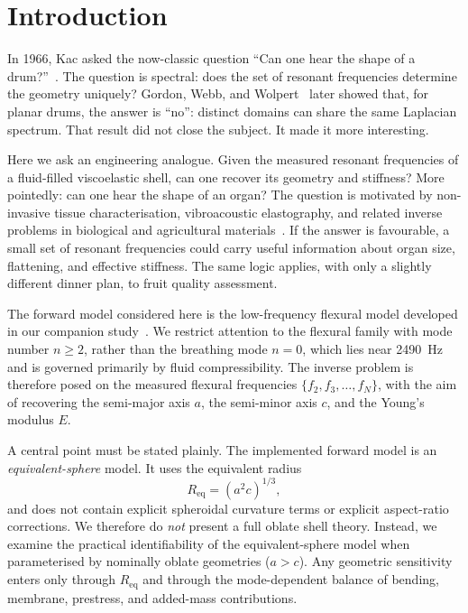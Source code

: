 \section{Introduction}\label{sec:introduction}

In 1966, Kac asked the now-classic question ``Can one hear the shape of a
drum?''~\cite{Kac1966}.  The question is spectral: does the set of resonant
frequencies determine the geometry uniquely?  Gordon, Webb, and
Wolpert~\cite{Gordon1992} later showed that, for planar drums, the answer is
``no'': distinct domains can share the same Laplacian spectrum.  That result
did not close the subject.  It made it more interesting.

Here we ask an engineering analogue.  Given the measured resonant frequencies
of a fluid-filled viscoelastic shell, can one recover its geometry and
stiffness?  More pointedly: can one hear the shape of an organ?  The question
is motivated by non-invasive tissue characterisation, vibroacoustic
elastography, and related inverse problems in biological and agricultural
materials~\cite{Sarvazyan1998,Doyley2012}.  If the answer is favourable, a
small set of resonant frequencies could carry useful information about organ
size, flattening, and effective stiffness.  The same logic applies, with only a
slightly different dinner plan, to fruit quality assessment.

The forward model considered here is the low-frequency flexural model developed
in our companion study~\cite{BrowntoneCompanion}.  We restrict attention to the
flexural family with mode number $n \geq 2$, rather than the breathing mode
$n=0$, which lies near \SI{2490}{Hz} and is governed primarily by fluid
compressibility.  The inverse problem is therefore posed on the measured
flexural frequencies
$\{f_2,f_3,\ldots,f_N\}$, with the aim of recovering the semi-major axis $a$,
the semi-minor axis $c$, and the Young's modulus $E$.

A central point must be stated plainly.  The implemented forward model is an
\emph{equivalent-sphere} model.  It uses the equivalent radius
\begin{equation}
  R_\mathrm{eq} = (a^2 c)^{1/3},
\end{equation}
and does not contain explicit spheroidal curvature terms or explicit
aspect-ratio corrections.  We therefore do \emph{not} present a full oblate
shell theory.  Instead, we examine the practical identifiability of the
equivalent-sphere model when parameterised by nominally oblate geometries
($a>c$).  Any geometric sensitivity enters only through
$R_\mathrm{eq}$ and through the mode-dependent balance of bending, membrane,
prestress, and added-mass contributions.

